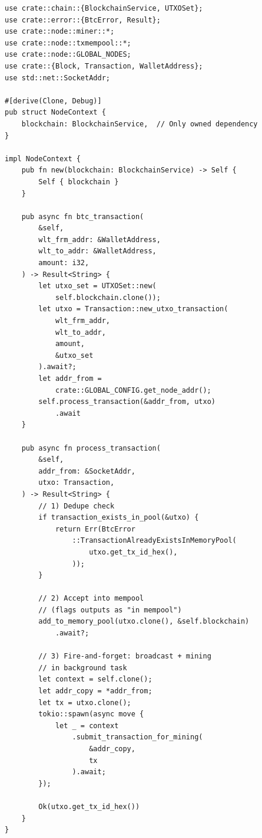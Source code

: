\begin{listing}[htbp]
\caption{NodeContext initialization and transaction acceptance}
\label{lst:ch13-nodecontext-init}
\begin{verbatim}
use crate::chain::{BlockchainService, UTXOSet};
use crate::error::{BtcError, Result};
use crate::node::miner::*;
use crate::node::txmempool::*;
use crate::node::GLOBAL_NODES;
use crate::{Block, Transaction, WalletAddress};
use std::net::SocketAddr;

#[derive(Clone, Debug)]
pub struct NodeContext {
    blockchain: BlockchainService,  // Only owned dependency
}

impl NodeContext {
    pub fn new(blockchain: BlockchainService) -> Self {
        Self { blockchain }
    }

    pub async fn btc_transaction(
        &self,
        wlt_frm_addr: &WalletAddress,
        wlt_to_addr: &WalletAddress,
        amount: i32,
    ) -> Result<String> {
        let utxo_set = UTXOSet::new(
            self.blockchain.clone());
        let utxo = Transaction::new_utxo_transaction(
            wlt_frm_addr,
            wlt_to_addr,
            amount,
            &utxo_set
        ).await?;
        let addr_from =
            crate::GLOBAL_CONFIG.get_node_addr();
        self.process_transaction(&addr_from, utxo)
            .await
    }

    pub async fn process_transaction(
        &self,
        addr_from: &SocketAddr,
        utxo: Transaction,
    ) -> Result<String> {
        // 1) Dedupe check
        if transaction_exists_in_pool(&utxo) {
            return Err(BtcError
                ::TransactionAlreadyExistsInMemoryPool(
                    utxo.get_tx_id_hex(),
                ));
        }

        // 2) Accept into mempool
        // (flags outputs as "in mempool")
        add_to_memory_pool(utxo.clone(), &self.blockchain)
            .await?;

        // 3) Fire-and-forget: broadcast + mining
        // in background task
        let context = self.clone();
        let addr_copy = *addr_from;
        let tx = utxo.clone();
        tokio::spawn(async move {
            let _ = context
                .submit_transaction_for_mining(
                    &addr_copy,
                    tx
                ).await;
        });

        Ok(utxo.get_tx_id_hex())
    }
}
\end{verbatim}
\end{listing}

